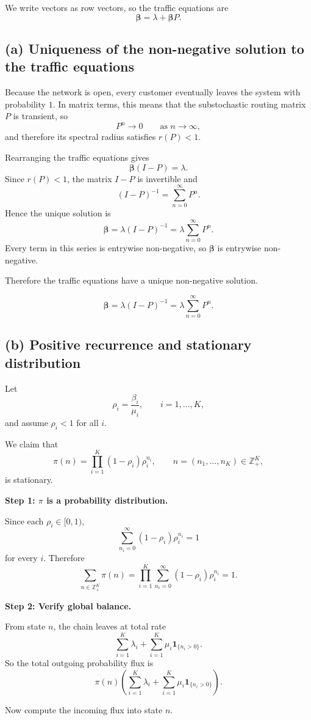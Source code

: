 \documentclass[11pt,a4paper]{article}
\newcommand{\1}{\mathbf{1}}
\newcommand{\bbeta}{\boldsymbol{\beta}}
\begin{document}
We write vectors as row vectors, so the traffic equations are
\[
\bbeta=\lambda+\bbeta P.
\]

\subsection*{(a) Uniqueness of the non-negative solution to the traffic equations}
Because the network is open, every customer eventually leaves the system with probability $1$. In matrix terms, this means that the substochastic routing matrix $P$ is transient, so
\[
P^n\to 0\qquad \text{as }n\to\infty,
\]
and therefore its spectral radius satisfies $r(P)<1$.

Rearranging the traffic equations gives
\[
\bbeta(I-P)=\lambda.
\]
Since $r(P)<1$, the matrix $I-P$ is invertible and
\[
(I-P)^{-1}=\sum_{n=0}^{\infty}P^n.
\]
Hence the unique solution is
\[
\bbeta=\lambda(I-P)^{-1}
=\lambda\sum_{n=0}^{\infty}P^n.
\]
Every term in this series is entrywise non-negative, so $\bbeta$ is entrywise non-negative.

Therefore the traffic equations have a unique non-negative solution.

\[
\boxed{\bbeta=\lambda(I-P)^{-1}=\lambda\sum_{n=0}^{\infty}P^n.}
\]

\subsection*{(b) Positive recurrence and stationary distribution}
Let
\[
\rho_i=\frac{\beta_i}{\mu_i},\qquad i=1,\dots,K,
\]
and assume $\rho_i<1$ for all $i$.

We claim that
\[
\pi(n)=\prod_{i=1}^K (1-\rho_i)\rho_i^{n_i},
\qquad n=(n_1,\dots,n_K)\in\mathbb{Z}_+^K,
\]
is stationary.

\textbf{Step 1: $\pi$ is a probability distribution.}

Since each $\rho_i\in[0,1)$,
\[
\sum_{n_i=0}^{\infty}(1-\rho_i)\rho_i^{n_i}=1
\]
for every $i$. Therefore
\[
\sum_{n\in\mathbb{Z}_+^K}\pi(n)
=\prod_{i=1}^K \sum_{n_i=0}^{\infty}(1-\rho_i)\rho_i^{n_i}
=1.
\]

\textbf{Step 2: Verify global balance.}

From state $n$, the chain leaves at total rate
\[
\sum_{i=1}^K \lambda_i+\sum_{i=1}^K \mu_i \1_{\{n_i>0\}}.
\]
So the total outgoing probability flux is
\[
\pi(n)\left(\sum_{i=1}^K \lambda_i+\sum_{i=1}^K \mu_i \1_{\{n_i>0\}}\right).
\]

Now compute the incoming flux into state $n$.
\end{document}
